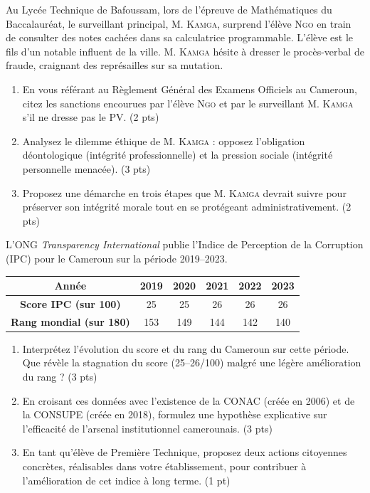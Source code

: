 \documentclass[11pt]{article}
\begin{document}
\begin{exercice}
Au Lycée Technique de Bafoussam, lors de l'épreuve de Mathématiques du Baccalauréat, le surveillant principal, M. \textsc{Kamga}, surprend l'élève \textsc{Ngo} en train de consulter des notes cachées dans sa calculatrice programmable. L'élève est le fils d'un notable influent de la ville. M. \textsc{Kamga} hésite à dresser le procès-verbal de fraude, craignant des représailles sur sa mutation.
\begin{enumerate}
    \item En vous référant au Règlement Général des Examens Officiels au Cameroun, citez les sanctions encourues par l'élève \textsc{Ngo} et par le surveillant M. \textsc{Kamga} s'il ne dresse pas le PV. (2 pts)
    \item Analysez le dilemme éthique de M. \textsc{Kamga} : opposez l'obligation déontologique (intégrité professionnelle) et la pression sociale (intégrité personnelle menacée). (3 pts)
    \item Proposez une démarche en trois étapes que M. \textsc{Kamga} devrait suivre pour préserver son intégrité morale tout en se protégeant administrativement. (2 pts)
\end{enumerate}
\end{exercice}

\begin{exercice}
L'ONG \textit{Transparency International} publie l'Indice de Perception de la Corruption (IPC) pour le Cameroun sur la période 2019--2023.
\begin{center}
\begin{tabular}{|c|c|c|c|c|c|}
\hline
\textbf{Année} & 2019 & 2020 & 2021 & 2022 & 2023 \\
\hline
\textbf{Score IPC (sur 100)} & 25 & 25 & 26 & 26 & 26 \\
\hline
\textbf{Rang mondial (sur 180)} & 153 & 149 & 144 & 142 & 140 \\
\hline
\end{tabular}
\end{center}
\begin{enumerate}
    \item Interprétez l'évolution du score et du rang du Cameroun sur cette période. Que révèle la stagnation du score (25--26/100) malgré une légère amélioration du rang ? (3 pts)
    \item En croisant ces données avec l'existence de la CONAC (créée en 2006) et de la CONSUPE (créée en 2018), formulez une hypothèse explicative sur l'efficacité de l'arsenal institutionnel camerounais. (3 pts)
    \item En tant qu'élève de Première Technique, proposez deux actions citoyennes concrètes, réalisables dans votre établissement, pour contribuer à l'amélioration de cet indice à long terme. (1 pt)
\end{enumerate}
\end{exercice}
\end{document}
